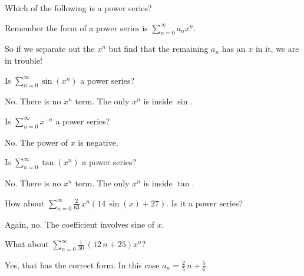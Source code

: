 \documentclass{ximera}
\begin{document}
\begin{question}
  Which of the following is a power series?

  \begin{solution}
    \begin{hint}
      Remember the form of a power series is \(\displaystyle\sum_{n=0}^\infty a_n x^n\).
    \end{hint}
    \begin{hint}
      So if we separate out the \(x^n\) but find that the remaining \(a_n\) has an \(x\) in it, we are in trouble!
    \end{hint}
    \begin{hint}
      Is \(\displaystyle\sum_{n=0}^\infty \sin\left(x^{n}\right)\) a power series?
    \end{hint}
    \begin{hint}
      No.  There is no \(x^n\) term.  The only \(x^n\) is inside \(\sin\).
    \end{hint}
    \begin{hint}
      Is \(\displaystyle\sum_{n=0}^\infty x^{-n}\) a power series?
    \end{hint}
    \begin{hint}
      No.  The power of \(x\) is negative.
    \end{hint}
    \begin{hint}
      Is \(\displaystyle\sum_{n=0}^\infty \tan\left(x^{n}\right)\) a power series?
    \end{hint}
    \begin{hint}
      No.  There is no \(x^n\) term.  The only \(x^n\) is inside \(\tan\).
    \end{hint}
    \begin{hint}
      How about \(\displaystyle\sum_{n=0}^\infty \displaystyle\frac{2}{63} \, x^{n} {\left(14 \, \sin\left(x\right) + 27\right)}\).  Is it a power series?
    \end{hint}
    \begin{hint}
      Again, no.  The coefficient involves sine of \(x\).
    \end{hint}
    \begin{hint}
      What about \(\displaystyle\sum_{n=0}^\infty \displaystyle\frac{1}{30} \, {\left(12 \, n + 25\right)} x^{n}\)?
    \end{hint}
    \begin{hint}
      Yes, that has the correct form.  In this case \(a_n = \displaystyle\frac{2}{5} \, n + \displaystyle\frac{5}{6}\).
    \end{hint}


\end{solution}
\end{question}
\end{document}
